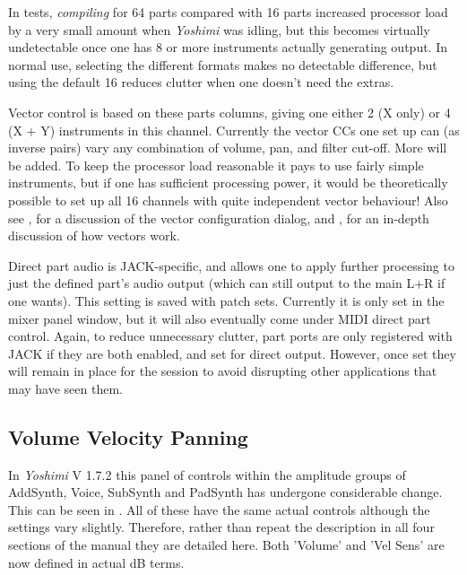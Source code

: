    In tests, \textsl{compiling} for 64 parts compared with 16 parts increased
   processor load by a very small amount when \textsl{Yoshimi} was idling,
   but this becomes virtually undetectable once one has 8 or more instruments
   actually generating output. In normal use, selecting the different formats
   makes no detectable difference, but using the default 16 reduces clutter
   when one doesn't need the extras.

   Vector control is based on these parts columns, giving one either 2 (X
   only) or 4 (X + Y) instruments in this channel. Currently the vector
   CCs one set up can (as inverse pairs) vary any combination of volume, pan,
   and filter cut-off.  More will be added.  To keep the processor load
   reasonable it pays to use fairly simple instruments, but if one has
   sufficient processing power, it would be theoretically possible to set up
   all 16 channels with quite independent vector behaviour!
   Also see
   , for a discussion of the vector
   configuration dialog, and , for an in-depth
   discussion of how vectors work.

   Direct part audio is JACK-specific, and allows one to apply further
   processing to just the defined part's audio output (which can still output
   to the main L+R if one wants). This setting is saved with patch sets.
   Currently it is only set in the mixer panel window, but it will also
   eventually come under MIDI direct part control.  Again, to reduce
   unnecessary clutter, part ports are only registered with JACK if they are
   both enabled, and set for direct output. However, once set they will remain
   in place for the session to avoid disrupting other applications that may
   have seen them.

\subsection{Volume Velocity Panning}
\label{subsec:volume_panning}
   In \textsl{Yoshimi} V 1.7.2 this panel of controls within the amplitude
   groups of AddSynth, Voice, SubSynth and PadSynth has undergone considerable
   change. This can be seen in . All of these
   have the same actual controls although the settings vary slightly.
   Therefore, rather than repeat the description in all four sections of the
   manual they are detailed here.
   Both 'Volume' and 'Vel Sens' are now defined in actual dB terms.


